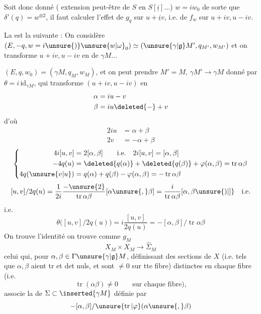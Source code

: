Soit donc donné ( extension peut-être de $S$ en $S[\underline{i}]\ldots$) $w=iw_0$ de sorte que $\delta'(q)=w^{\otimes2}$, il faut calculer l'effet de $g_q$ sur $u+\underline{i}v$, i.e. de $f_w$ sur $u+iv,u-iv$.

La  est la suivante : On considère $(E,-q,w=i\unsure{)}\unsure{w|\omega}_0)\simeq(\unsure{\gamma|\mathfrak g}M',q_{M'},w_{M'})$ et on transforme $u+iv,u-iv$ en  de $\gamma M\ldots$

 \quad $(E,q,w_0)=(\gamma M,q_M,w_M)$,
 et on peut prendre $M'=M$, $\gamma M'\longrightarrow\gamma M$ donné par $\theta=i\,\mathrm{id}_{\gamma M}$, qui transforme $(u+iv,u-iv)$ en
\[
\begin{aligned}
\alpha&=iu-v\\
\beta&=iu\deleted{-}+v
\end{aligned}
\]
d'où
\[
\begin{aligned}
2iu&=\alpha+\beta\\
2v&=-\alpha+\beta
\end{aligned}
\]
\[
\left\{\begin{aligned}
4i[u,v]&=2[\alpha,\beta]\qquad\text{i.e.}\quad 2i[u,v]=[\alpha,\beta]\\
-4q(u)&=\deleted{q(\alpha)}+\deleted{q(\beta)}+\varphi(\alpha,\beta)=\operatorname{tr}\alpha\beta\\
4q(\unsure{v|u})&=q(\alpha)+q(\beta)-\varphi(\alpha,\beta)=-\operatorname{tr}\alpha\beta
\end{aligned}\right.
\]
\[
[u,v]/2q(u)=\frac{1}{2i}\frac{-\unsure{2}}{\operatorname{tr}\alpha\beta}[\alpha\unsure{,}\beta]=\frac{i}{\operatorname{tr}\alpha\beta}[\alpha,\beta\unsure{)|]}\quad\text{i.e.}
\]
i.e.
\[
\theta\bigl([u,v]/2q(u)\bigr)=i\frac{[u,v]}{2q(u)}=-[\alpha,\beta]/\operatorname{tr}\alpha\beta
\]
On trouve l'identité  on trouve comme  $g_M$
\[
X_M\times X_M\longrightarrow\widehat{\Sigma}_M
\]
celui qui, pour $\alpha,\beta\in\Gamma\unsure{\gamma|\mathfrak g}M$, définissant des sections de $X$ (i.e. tels que $\alpha,\beta$ aient tr et det nuls, et sont $\ne0$ sur tte fibre) distinctes en chaque fibre (i.e.
\[
\operatorname{tr}(\alpha\beta)\ne0\qquad\text{sur chaque fibre),}
\]
associe la  de $\Sigma\subset\inserted{\gamma M}$ définie par
\[
-[\alpha,\beta]/\unsure{\operatorname{tr}|\varphi}(\alpha\unsure{,}\beta)
\]
